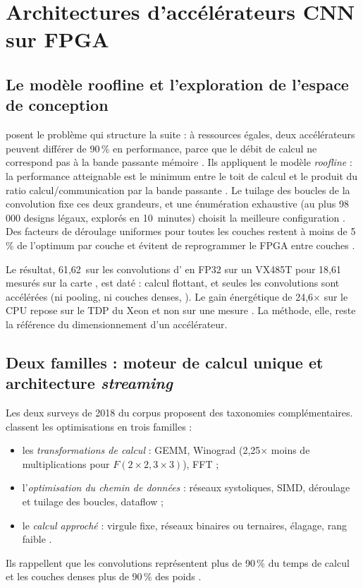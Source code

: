 \section{Architectures d'accélérateurs CNN sur FPGA}
\label{sec:architectures}

\subsection{Le modèle roofline et l'exploration de l'espace de conception}

\citet{2015-zhang-optimizing-fpga-accelerator-design-deep} posent le problème qui structure
la suite : à ressources égales, deux accélérateurs peuvent différer de 90\,\% en
performance, parce que le débit de calcul ne correspond pas à la bande passante mémoire
. Ils appliquent le modèle \emph{roofline} : la performance atteignable est le
minimum entre le toit de calcul et le produit du ratio calcul/communication par la bande
passante . Le tuilage des boucles de la convolution fixe ces deux
grandeurs, et une énumération exhaustive (au plus 98\,000 designs légaux, explorés en
10~minutes) choisit la meilleure configuration . Des facteurs de déroulage
uniformes pour toutes les couches restent à moins de 5\,\% de l'optimum par couche et
évitent de reprogrammer le FPGA entre couches .

Le résultat, 61,62\, sur les convolutions d' en FP32 sur un  VX485T
pour 18,61\, mesurés sur la carte , est daté : calcul flottant, et
seules les convolutions sont accélérées (ni pooling, ni couches denses, ). Le
gain énergétique de 24,6$\times$ sur le CPU repose sur le TDP du Xeon et non sur une
mesure . La méthode, elle, reste la référence du dimensionnement d'un
accélérateur.

\subsection{Deux familles : moteur de calcul unique et architecture \emph{streaming}}

Les deux surveys de 2018 du corpus proposent des taxonomies complémentaires.
\citet{arxiv-1806.01683-accelerating-cnn-inference-fpgas-survey}\pp{} classent les
optimisations en trois familles  :
\begin{itemize}
  \item les \emph{transformations de calcul} : GEMM, Winograd (2,25$\times$ moins de
    multiplications pour $F(2{\times}2, 3{\times}3)$), FFT  ;
  \item l'\emph{optimisation du chemin de données} : réseaux systoliques, SIMD, déroulage et
    tuilage des boucles, dataflow  ;
  \item le \emph{calcul approché} : virgule fixe, réseaux binaires ou ternaires, élagage,
    rang faible .
\end{itemize}
Ils rappellent que les convolutions représentent plus de 90\,\% du temps de calcul et les
couches denses plus de 90\,\% des poids .

